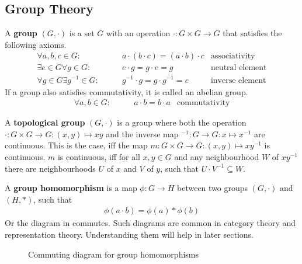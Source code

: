 \subsection{Group Theory}

A \textbf{group} $(G, \cdot)$ is a set $G$ with an operation $\cdot: G \times G \to G$ that satisfies the following axioms.
\begin{align}
    \forall a, b, c \in G: \qquad & a \cdot (b \cdot c) = (a \cdot b) \cdot c & \text{associativity} \\
    \exists e \in G \forall g \in G: \qquad & e \cdot g = g \cdot e = g & \text{neutral element} \\
    \forall g \in G \exists g^{-1} \in G: \qquad & g^{-1} \cdot g = g \cdot g^{-1} = e & \text{inverse element}
\end{align}
If a group also satisfies commutativity, it is called an abelian group.
\begin{align}
    \forall a, b \in G: \qquad & a \cdot b = b \cdot a & \text{commutativity}
\end{align}



A \textbf{topological group} $(G, \cdot)$ is a group where both the operation $\cdot: G \times G \to G: (x, y) \mapsto xy$ and the inverse map $^{-1}: G \to G: x \mapsto x^{-1}$ are continuous.
This is the case, iff the map $m: G \times G \to G: (x, y) \mapsto xy^{-1}$ is continuous.
$m$ is continuous, iff for all $x, y \in G$ and any neighbourhood $W$ of $xy^{-1}$ there are neighbourhoods $U$ of $x$ and $V$ of $y$, such that $U \cdot V^{-1} \subseteq W$.


A \textbf{group homomorphism} is a map $\phi: G \to H$ between two groups $(G, \cdot)$ and $(H, *)$, such that
\begin{align}
    \phi(a \cdot b) = \phi(a) * \phi(b)
\end{align}
Or the diagram in  commutes.
Such diagrams are common in category theory and representation theory.
Understanding them will help in later sections.
\begin{figure}[h]
    \centering
    \caption{Commuting diagram for group homomorphisms}
    \label{fig:fundamentals.groups.hom-cd}
\end{figure}


